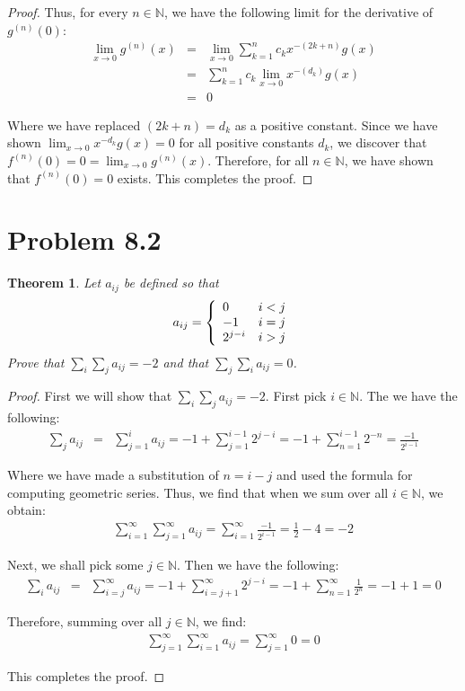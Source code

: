 \documentclass[psamsfonts]{amsart}
\newtheorem{thm}{Theorem}[section]
\theoremstyle{definition}
\theoremstyle{remark}
\numberwithin{equation}{section}
\begin{document}
\begin{proof}
Thus, for every $n \in \mathbb{N}$, we have the following limit for the derivative of $g^{(n)}(0)$: 
\begin{eqnarray}
\lim_{x \to 0} g^{(n)}(x) &=& \lim_{x \to 0}  \sum_{k=1}^n c_k x^{-(2k + n)} g(x) \\
&=& \sum_{k=1}^n c_k \lim_{x \to 0} x^{-(d_k)} g(x) \\
&=& 0
\end{eqnarray}

Where we have replaced $(2k+n) = d_k$ as a positive constant. Since we have shown $\lim_{x \to 0} x^{-d_k} g(x) = 0$ for all positive constants $d_k$, we discover that $f^{(n)} (0) = 0 = \lim_{x \to 0} g^{(n)}(x)$. Therefore, for all $n \in \mathbb{N}$, we have shown that $f^{(n)}(0) = 0$ exists. This completes the proof.
\end{proof}

\section{Problem 8.2}

\begin{thm}
Let $a_{ij}$ be defined so that
\begin{equation}
a_{ij} = \left\{ \begin{array}{l l}
0 & i < j \\
-1 & i = j \\
2^{j-i} &  i > j \end{array} \right. 
\end{equation}
Prove that $\sum_i \sum_j a_{ij} = -2$ and that $\sum_{j} \sum_i a_{ij} = 0$. 
\end{thm}

\begin{proof}
First we will show that $\sum_i \sum_j a_{ij} = -2$. First pick $i \in \mathbb{N}$. The we have the following:
\begin{eqnarray}
\sum_{j} a_{ij} &=& \sum_{j=1}^i a_{ij} = -1 + \sum_{j=1}^{i-1} 2^{j-i}= -1 + \sum_{n=1}^{i-1} 2^{-n} = \frac{-1}{2^{i-1}}
\end{eqnarray}

Where we have made a substitution of $n = i - j$ and used the formula for computing geometric series. Thus, we find that when we sum over all $i \in \mathbb{N}$, we obtain:
\begin{eqnarray}
\sum_{i=1}^\infty \sum_{j=1}^\infty a_{ij} = \sum_{i=1}^\infty \frac{-1}{2^{i-1}} = \frac{1}{2} -4 = -2
\end{eqnarray} 

Next, we shall pick some $j \in \mathbb{N}$. Then we have the following:
\begin{eqnarray}
\sum_i a_{ij} &=& \sum_{i=j}^\infty a_{ij} = -1 + \sum_{i=j+1}^\infty 2^{j-i} = -1 + \sum_{n = 1}^\infty \frac{1}{2^n} = -1 + 1 = 0
\end{eqnarray}

Therefore, summing over all $j \in \mathbb{N}$, we find:
\begin{eqnarray}
\sum_{j=1}^\infty \sum_{i=1}^\infty a_{ij} = \sum_{j=1}^\infty 0 = 0 
\end{eqnarray}

This completes the proof.
\end{proof}
\end{document}
